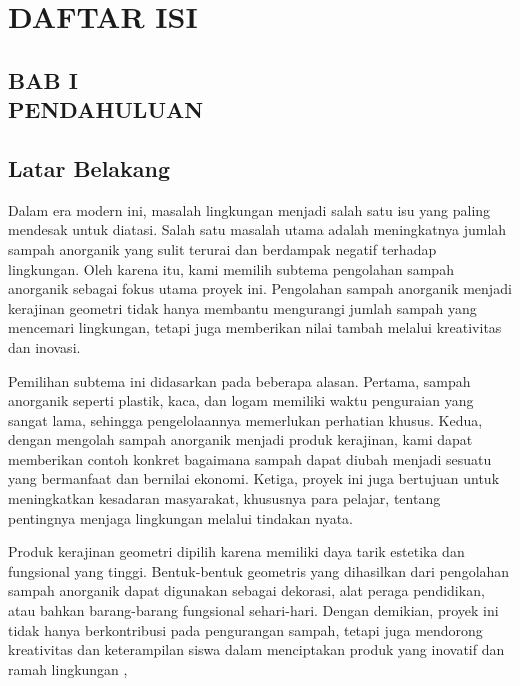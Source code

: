 \documentclass[a4paper,12pt]{article}
\begin{document}
    \section*{DAFTAR ISI}
\renewcommand{\cftdot}{.}
\tableofcontents
\pagebreak
\begin{center}
    \section*{BAB I\\PENDAHULUAN}
\end{center}
\setcounter{section}{1}
\subsection{Latar Belakang}
\setcounter{page}{1}
Dalam era modern ini, masalah lingkungan menjadi salah satu isu yang paling mendesak untuk diatasi. Salah satu masalah utama adalah meningkatnya jumlah sampah anorganik yang sulit terurai dan berdampak negatif terhadap lingkungan. Oleh karena itu, kami memilih subtema pengolahan sampah anorganik sebagai fokus utama proyek ini. Pengolahan sampah anorganik menjadi kerajinan geometri tidak hanya membantu mengurangi jumlah sampah yang mencemari lingkungan, tetapi juga memberikan nilai tambah melalui kreativitas dan inovasi. 

Pemilihan subtema ini didasarkan pada beberapa alasan. Pertama, sampah anorganik seperti plastik, kaca, dan logam memiliki waktu penguraian yang sangat lama, sehingga pengelolaannya memerlukan perhatian khusus. Kedua, dengan mengolah sampah anorganik menjadi produk kerajinan, kami dapat memberikan contoh konkret bagaimana sampah dapat diubah menjadi sesuatu yang bermanfaat dan bernilai ekonomi. Ketiga, proyek ini juga bertujuan untuk meningkatkan kesadaran masyarakat, khususnya para pelajar, tentang pentingnya menjaga lingkungan melalui tindakan nyata. 

Produk kerajinan geometri dipilih karena memiliki daya tarik estetika dan fungsional yang tinggi. Bentuk-bentuk geometris yang dihasilkan dari pengolahan sampah anorganik dapat digunakan sebagai dekorasi, alat peraga pendidikan, atau bahkan barang-barang fungsional sehari-hari. Dengan demikian, proyek ini tidak hanya berkontribusi pada pengurangan sampah, tetapi juga mendorong kreativitas dan keterampilan siswa dalam menciptakan produk yang inovatif dan ramah lingkungan \cite{GeometriArt},
\end{document}
